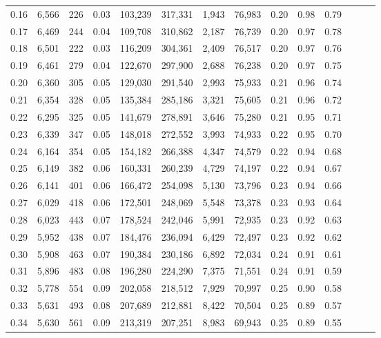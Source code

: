 \begin{tabular}{rrrrrrrrrrrrrr}
0.16 &  6,566 &    226 &  0.03 &  103,239 &  317,331 &   1,943 &  76,983 &  0.20 &  0.98 &      0.79 \\
0.17 &  6,469 &    244 &  0.04 &  109,708 &  310,862 &   2,187 &  76,739 &  0.20 &  0.97 &      0.78 \\
0.18 &  6,501 &    222 &  0.03 &  116,209 &  304,361 &   2,409 &  76,517 &  0.20 &  0.97 &      0.76 \\
0.19 &  6,461 &    279 &  0.04 &  122,670 &  297,900 &   2,688 &  76,238 &  0.20 &  0.97 &      0.75 \\
0.20 &  6,360 &    305 &  0.05 &  129,030 &  291,540 &   2,993 &  75,933 &  0.21 &  0.96 &      0.74 \\
0.21 &  6,354 &    328 &  0.05 &  135,384 &  285,186 &   3,321 &  75,605 &  0.21 &  0.96 &      0.72 \\
0.22 &  6,295 &    325 &  0.05 &  141,679 &  278,891 &   3,646 &  75,280 &  0.21 &  0.95 &      0.71 \\
0.23 &  6,339 &    347 &  0.05 &  148,018 &  272,552 &   3,993 &  74,933 &  0.22 &  0.95 &      0.70 \\
0.24 &  6,164 &    354 &  0.05 &  154,182 &  266,388 &   4,347 &  74,579 &  0.22 &  0.94 &      0.68 \\
0.25 &  6,149 &    382 &  0.06 &  160,331 &  260,239 &   4,729 &  74,197 &  0.22 &  0.94 &      0.67 \\
0.26 &  6,141 &    401 &  0.06 &  166,472 &  254,098 &   5,130 &  73,796 &  0.23 &  0.94 &      0.66 \\
0.27 &  6,029 &    418 &  0.06 &  172,501 &  248,069 &   5,548 &  73,378 &  0.23 &  0.93 &      0.64 \\
0.28 &  6,023 &    443 &  0.07 &  178,524 &  242,046 &   5,991 &  72,935 &  0.23 &  0.92 &      0.63 \\
0.29 &  5,952 &    438 &  0.07 &  184,476 &  236,094 &   6,429 &  72,497 &  0.23 &  0.92 &      0.62 \\
0.30 &  5,908 &    463 &  0.07 &  190,384 &  230,186 &   6,892 &  72,034 &  0.24 &  0.91 &      0.61 \\
0.31 &  5,896 &    483 &  0.08 &  196,280 &  224,290 &   7,375 &  71,551 &  0.24 &  0.91 &      0.59 \\
0.32 &  5,778 &    554 &  0.09 &  202,058 &  218,512 &   7,929 &  70,997 &  0.25 &  0.90 &      0.58 \\
0.33 &  5,631 &    493 &  0.08 &  207,689 &  212,881 &   8,422 &  70,504 &  0.25 &  0.89 &      0.57 \\
0.34 &  5,630 &    561 &  0.09 &  213,319 &  207,251 &   8,983 &  69,943 &  0.25 &  0.89 &      0.55 \\

\end{tabular}
